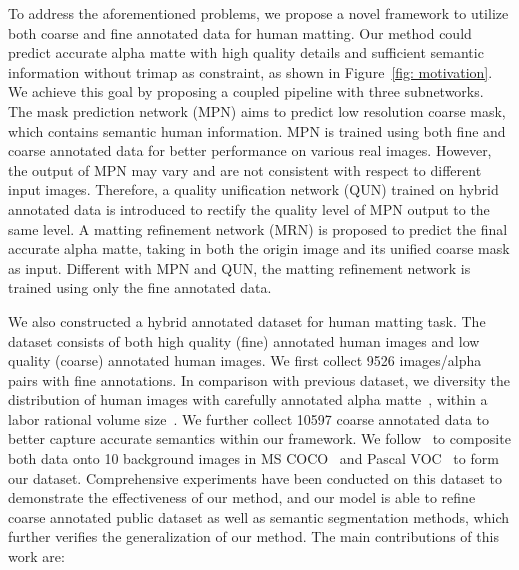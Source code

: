 \documentclass[10pt,twocolumn,letterpaper]{article}
\begin{document}
To address the aforementioned problems, we propose a novel framework to utilize both coarse and fine annotated data for human matting. Our method could predict accurate alpha matte with high quality details and sufficient semantic information without trimap as constraint, as shown in Figure~\ref{fig: motivation}. We achieve this goal by proposing a coupled pipeline with three subnetworks. The mask prediction network (MPN) aims to predict low resolution coarse mask, which contains semantic human information. MPN is trained using both fine and coarse annotated data for better performance on various real images. However, the output of MPN may vary and are not consistent with respect to different input images. Therefore, a quality unification network (QUN) trained on hybrid annotated data is introduced to rectify the quality level of MPN output to the same level. A matting refinement network (MRN) is proposed to predict the final accurate alpha matte, taking in both the origin image and its unified coarse mask as input. Different with MPN and QUN, the matting refinement network is trained using only the fine annotated data.



We also constructed a hybrid annotated dataset for human matting task. The dataset consists of both high quality (fine) annotated human images and low quality (coarse) annotated human images. We first collect 9526 images/alpha pairs with fine annotations. In comparison with previous dataset, we diversity the distribution of human images with carefully annotated alpha matte~\cite{shen2016deep,xu2017deep}, within a labor rational volume size~\cite{chen2018semantic}. We further collect 10597 coarse annotated data to better capture accurate semantics within our framework. We follow~\cite{xu2017deep} to composite both data onto 10 background images in MS COCO~\cite{lin2014microsoft} and Pascal VOC~\cite{everingham2010pascal} to form our dataset. Comprehensive experiments have been conducted on this dataset to demonstrate the effectiveness of our method, and our model is able to refine coarse annotated public dataset as well as semantic segmentation methods, which further verifies the generalization of our method. The main contributions of this work are:
\end{document}
